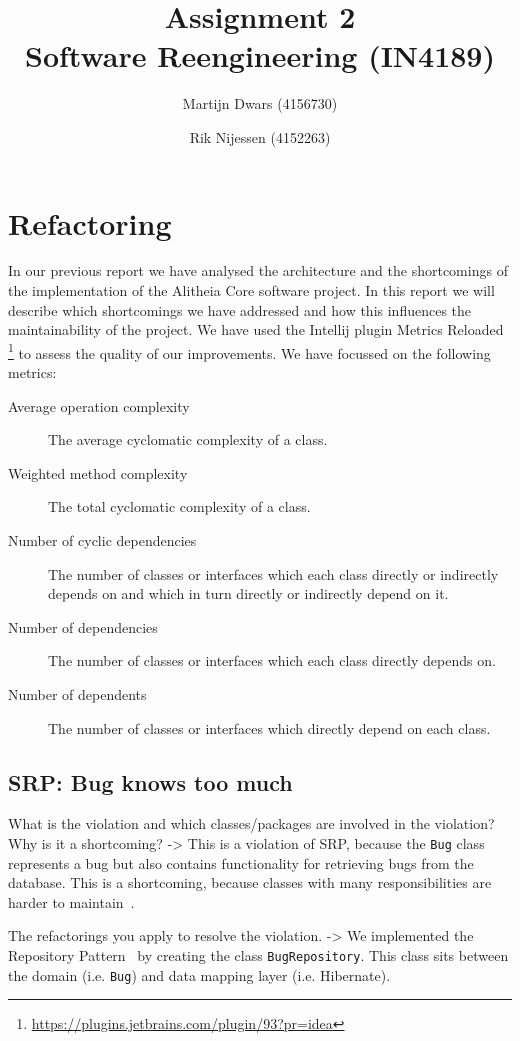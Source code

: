 \documentclass{article}
\author{Martijn Dwars (4156730) \and Rik Nijessen (4152263)}
\title{Assignment 2 \\ Software Reengineering (IN4189)}
\begin{document}
\maketitle

\section{Refactoring}
In our previous report we have analysed the architecture and the shortcomings of the implementation of the Alitheia Core software project. In this report we will describe which shortcomings we have addressed and how this influences the maintainability of the project.
We have used the Intellij plugin Metrics Reloaded \footnote{\url{https://plugins.jetbrains.com/plugin/93?pr=idea}} to assess the quality of our improvements. We have focussed on the following metrics:
\begin{description}
\item[Average operation complexity] The average cyclomatic complexity of a class.
\item[Weighted method complexity] The total cyclomatic complexity of a class.
\item[Number of cyclic dependencies]  The number of classes or interfaces which each class directly or indirectly depends on and which in turn directly or indirectly depend on it. 
\item[Number of dependencies] The number of classes or interfaces which each class directly depends on.
\item[Number of dependents] The number of classes or interfaces which directly depend on each class.
\end{description}
\subsection{SRP: Bug knows too much}
What is the violation and which classes/packages are involved in the violation? Why is it a shortcoming?
 -> This is a violation of SRP, because the \verb|Bug| class represents a bug but also contains functionality for retrieving bugs from the database. This is a shortcoming, because classes with many responsibilities are harder to maintain~\cite{martin2003agile}.

The refactorings you apply to resolve the violation.
 -> We implemented the Repository Pattern~\cite{repository} by creating the class \verb|BugRepository|. This class sits between the domain (i.e. \verb|Bug|) and data mapping layer (i.e. Hibernate).
\end{document}
